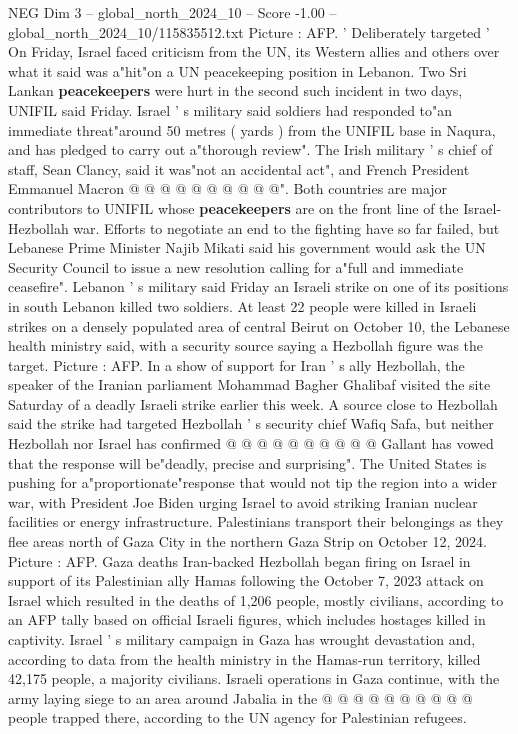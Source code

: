 \begin{textsample}{NEG Dim 3 – global\_north\_2024\_10 – Score -1.00 – global\_north\_2024\_10/115835512.txt}
Picture : AFP. ' Deliberately targeted ' On Friday, Israel faced criticism from the UN, its Western allies and others over what it said was a"hit"on a UN peacekeeping position in Lebanon.
Two Sri Lankan \textbf{peacekeepers} were hurt in the second such incident in two days, UNIFIL said Friday.
Israel ' s military said soldiers had responded to"an immediate threat"around 50 metres ( yards ) from the UNIFIL base in Naqura, and has pledged to carry out a"thorough review".
The Irish military ' s chief of staff, Sean Clancy, said it was"not an accidental act", and French President Emmanuel Macron @ @ @ @ @ @ @ @ @ @".
Both countries are major contributors to UNIFIL whose \textbf{peacekeepers} are on the front line of the Israel-Hezbollah war.
Efforts to negotiate an end to the fighting have so far failed, but Lebanese Prime Minister Najib Mikati said his government would ask the UN Security Council to issue a new resolution calling for a"full and immediate ceasefire".
Lebanon ' s military said Friday an Israeli strike on one of its positions in south Lebanon killed two soldiers.
At least 22 people were killed in Israeli strikes on a densely populated area of central Beirut on October 10, the Lebanese health ministry said, with a security source saying a Hezbollah figure was the target.
Picture : AFP.
In a show of support for Iran ' s ally Hezbollah, the speaker of the Iranian parliament Mohammad Bagher Ghalibaf visited the site Saturday of a deadly Israeli strike earlier this week.
A source close to Hezbollah said the strike had targeted Hezbollah ' s security chief Wafiq Safa, but neither Hezbollah nor Israel has confirmed @ @ @ @ @ @ @ @ @ @ Gallant has vowed that the response will be"deadly, precise and surprising".
The United States is pushing for a"proportionate"response that would not tip the region into a wider war, with President Joe Biden urging Israel to avoid striking Iranian nuclear facilities or energy infrastructure.
Palestinians transport their belongings as they flee areas north of Gaza City in the northern Gaza Strip on October 12, 2024.
Picture : AFP.
Gaza deaths Iran-backed Hezbollah began firing on Israel in support of its Palestinian ally Hamas following the October 7, 2023 attack on Israel which resulted in the deaths of 1,206 people, mostly civilians, according to an AFP tally based on official Israeli figures, which includes hostages killed in captivity.
Israel ' s military campaign in Gaza has wrought devastation and, according to data from the health ministry in the Hamas-run territory, killed 42,175 people, a majority civilians.
Israeli operations in Gaza continue, with the army laying siege to an area around Jabalia in the @ @ @ @ @ @ @ @ @ @ people trapped there, according to the UN agency for Palestinian refugees.

\end{textsample}
